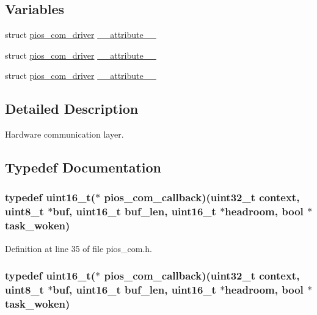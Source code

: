 \subsection*{Variables}
\begin{DoxyCompactItemize}
\item 
struct \hyperlink{structpios__com__driver}{pios\-\_\-com\-\_\-driver} \hyperlink{group___p_i_o_s___c_o_m_ga96488b3664325a6ced2f450ae40fb296}{\-\_\-\-\_\-attribute\-\_\-\-\_\-}
\item 
struct \hyperlink{structpios__com__driver}{pios\-\_\-com\-\_\-driver} \hyperlink{group___p_i_o_s___c_o_m_ga96488b3664325a6ced2f450ae40fb296}{\-\_\-\-\_\-attribute\-\_\-\-\_\-}
\item 
struct \hyperlink{structpios__com__driver}{pios\-\_\-com\-\_\-driver} \hyperlink{group___p_i_o_s___c_o_m_ga96488b3664325a6ced2f450ae40fb296}{\-\_\-\-\_\-attribute\-\_\-\-\_\-}
\end{DoxyCompactItemize}


\subsection{Detailed Description}
Hardware communication layer. 

\subsection{Typedef Documentation}
\hypertarget{group___p_i_o_s___c_o_m_ga23f1888821f1f74a50c02adc459df597}{
\subsubsection[{pios\-\_\-com\-\_\-callback}]{\setlength{\rightskip}{0pt plus 5cm}typedef {\bf uint16\-\_\-t}($\ast$ pios\-\_\-com\-\_\-callback)({\bf uint32\-\_\-t} context, {\bf uint8\-\_\-t} $\ast${\bf buf}, {\bf uint16\-\_\-t} buf\-\_\-len, {\bf uint16\-\_\-t} $\ast$headroom, {\bf bool} $\ast$task\-\_\-woken)}}\label{group___p_i_o_s___c_o_m_ga23f1888821f1f74a50c02adc459df597}


Definition at line 35 of file pios\-\_\-com.\-h.

\hypertarget{group___p_i_o_s___c_o_m_ga23f1888821f1f74a50c02adc459df597}{
\subsubsection[{pios\-\_\-com\-\_\-callback}]{\setlength{\rightskip}{0pt plus 5cm}typedef {\bf uint16\-\_\-t}($\ast$ pios\-\_\-com\-\_\-callback)({\bf uint32\-\_\-t} context, {\bf uint8\-\_\-t} $\ast${\bf buf}, {\bf uint16\-\_\-t} buf\-\_\-len, {\bf uint16\-\_\-t} $\ast$headroom, {\bf bool} $\ast$task\-\_\-woken)}}\label{group___p_i_o_s___c_o_m_ga23f1888821f1f74a50c02adc459df597}


